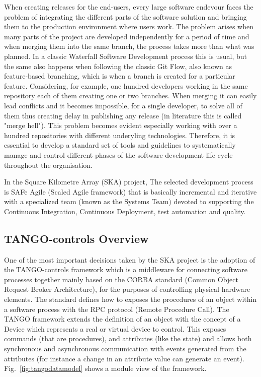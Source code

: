 \documentclass[a4paper]{spie}  %
\begin{document}
When creating releases for the end-users, every large software endevour faces the problem of integrating the different parts of the software solution and bringing them to the production environment where users work. The problem arises when many parts of the project are developed independently for a period of time and when merging them into the same branch, the process takes more than what was planned. In a classic Waterfall Software Development process this is usual, but the same also happens when following the classic Git Flow, also known as feature-based branching, which is when a branch is created for a particular feature. Considering, for example, one hundred developers working in the same repository each of them creating one or two branches. When merging it can easily lead conflicts and it becomes impossible, for a single developer, to solve all of them thus creating delay in publishing any release (in literature this is called "merge hell"). This problem becomes evident especially working with over a hundred repositories with different underyling technologies. Therefore, it is essential to develop a standard set of tools and guidelines to systematically manage and control different phases of the software development life cycle throughout the organisation.

In the Square Kilometre Array (SKA) project, The selected development process is SAFe Agile (Scaled Agile framework) that is basically incremental and iterative with a specialized team (known as the Systems Team) devoted to supporting the Continuous Integration, Continuous Deployment, test automation and quality.

\subsection{TANGO-controls Overview}
One of the most important decisions taken by the SKA project is the adoption of the TANGO-controls\cite{tango-controls} framework which is a middleware for connecting software processes together mainly based on the CORBA standard (Common Object Request Broker Architecture), for the purposes of controlling physical hardware elements. The standard defines how to exposes the procedures of an object within a software process with the RPC protocol (Remote Procedure Call).  The TANGO framework extends the definition of an object with the concept of a Device which represents a real or virtual device to control.  This exposes commands (that are procedures), and attributes (like the state) and allows both synchronous and asynchronous communication with events generated from the attributes (for instance a change in an attribute value can generate an event). Fig.~\ref{fig:tangodatamodel}  shows a module view of the framework.
\end{document}
